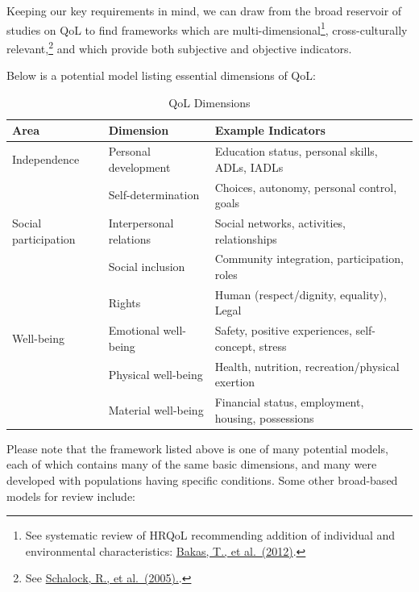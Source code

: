 \documentclass[
]{book}
\begin{document}
Keeping our key requirements in mind, we can draw from the broad reservoir of studies on QoL to find frameworks which are multi-dimensional\footnote{See systematic review of HRQoL recommending addition of individual and environmental characteristics: \href{https://www.ncbi.nlm.nih.gov/pmc/articles/PMC3548743/}{Bakas, T., et al.~(2012)}.}, cross-culturally relevant,\footnote{See \href{https://www.researchgate.net/profile/Mian_Wang4/publication/7801771_Cross-Cultural_Study_of_Quality_of_Life_Indicators/links/0deec52df448eac34d000000/Cross-Cultural-Study-of-Quality-of-Life-Indicators.pdf}{Schalock, R., et al.~(2005).}.} and which provide both subjective and objective indicators.

Below is a potential model listing essential dimensions of QoL:

\begin{table}

\caption{\label{tab:unnamed-chunk-4}QoL Dimensions}
\centering
\begin{tabular}[t]{l|l|l}
\hline
Area & Dimension & Example Indicators\\
\hline
Independence & Personal development & Education status, personal skills, ADLs, IADLs\\
\hline
 & Self-determination & Choices, autonomy, personal control, goals\\
\hline
Social participation & Interpersonal relations & Social networks, activities, relationships\\
\hline
 & Social inclusion & Community integration, participation, roles\\
\hline
 & Rights & Human (respect/dignity, equality), Legal\\
\hline
Well-being & Emotional well-being & Safety, positive experiences, self-concept, stress\\
\hline
 & Physical well-being & Health, nutrition, recreation/physical exertion\\
\hline
 & Material well-being & Financial status, employment, housing, possessions\\
\hline
\end{tabular}
\end{table}

Please note that the framework listed above is one of many potential models, each of which contains many of the same basic dimensions, and many were developed with populations having specific conditions. Some other broad-based models for review include:
\end{document}
